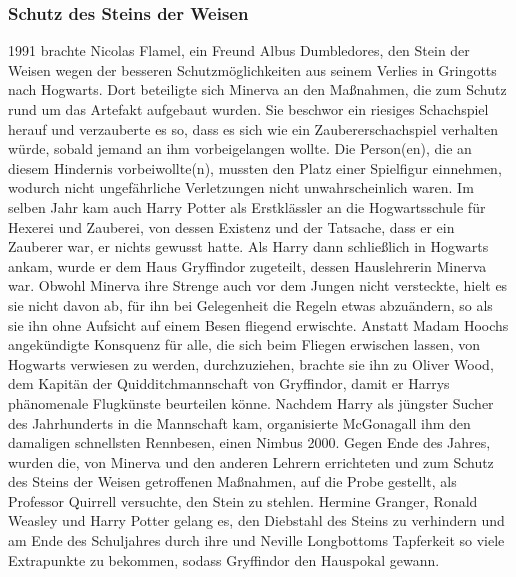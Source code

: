 \documentclass[a4paper, 10pt]{article}
\begin{document}
\subsubsection*{\large Schutz des Steins der Weisen}
1991 brachte Nicolas Flamel, ein Freund Albus Dumbledores, den Stein der Weisen wegen der besseren Schutzmöglichkeiten aus seinem Verlies in Gringotts nach Hogwarts. Dort beteiligte sich Minerva an den Maßnahmen, die zum Schutz rund um das Artefakt aufgebaut wurden. Sie beschwor ein riesiges Schachspiel herauf und verzauberte es so, dass es sich wie ein Zaubererschachspiel verhalten würde, sobald jemand an ihm vorbeigelangen wollte. Die Person(en), die an diesem Hindernis vorbeiwollte(n), mussten den Platz einer Spielfigur einnehmen, wodurch nicht ungefährliche Verletzungen nicht unwahrscheinlich waren. 
\vspace{10pt}
\newline
Im selben Jahr kam auch Harry Potter als Erstklässler an die Hogwartsschule für Hexerei und Zauberei, von dessen Existenz und der Tatsache, dass er ein Zauberer war, er nichts gewusst hatte. Als Harry dann schließlich in Hogwarts ankam, wurde er dem Haus Gryffindor zugeteilt, dessen Hauslehrerin Minerva war.
\vspace{10pt}
\newline
Obwohl Minerva ihre Strenge auch vor dem Jungen nicht versteckte, hielt es sie nicht davon ab, für ihn bei Gelegenheit die Regeln etwas abzuändern, so als sie ihn ohne Aufsicht auf einem Besen fliegend erwischte. Anstatt Madam Hoochs angekündigte Konsquenz für alle, die sich beim Fliegen erwischen lassen, von Hogwarts verwiesen zu werden, durchzuziehen, brachte sie ihn zu Oliver Wood, dem Kapitän der Quidditchmannschaft von Gryffindor, damit er Harrys phänomenale Flugkünste beurteilen könne.
\vspace{10pt}
\newline
Nachdem Harry als jüngster Sucher des Jahrhunderts in die Mannschaft kam, organisierte McGonagall ihm den damaligen schnellsten Rennbesen, einen Nimbus 2000. Gegen Ende des Jahres, wurden die, von Minerva und den anderen Lehrern errichteten und zum Schutz des Steins der Weisen getroffenen Maßnahmen, auf die Probe gestellt, als Professor Quirrell versuchte, den Stein zu stehlen. Hermine Granger, Ronald Weasley und Harry Potter gelang es, den Diebstahl des Steins zu verhindern und am Ende des Schuljahres durch ihre und Neville Longbottoms Tapferkeit so viele Extrapunkte zu bekommen, sodass Gryffindor den Hauspokal gewann.
\end{document}
